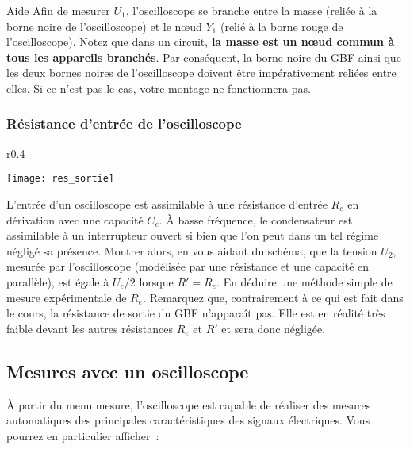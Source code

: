 \documentclass[a4paper, 11pt, final, garamond]{book}
\begin{document}
\medskip
\vspace{10pt}

\begin{instruc}{Aide}
    Afin de mesurer $U_1$, l'oscilloscope se branche entre la masse (reliée à la
    borne noire de l'oscilloscope) et le nœud $Y_1$ (relié à la borne rouge de
    l'oscilloscope). Notez que dans un circuit, \textbf{la masse est un nœud
    commun à tous les appareils branchés}.
    Par conséquent, la borne noire du GBF ainsi que les deux bornes noires de
    l'oscilloscope doivent être impérativement reliées entre elles. Si ce n'est
    pas le cas, votre montage ne fonctionnera pas.
\end{instruc}

\subsubsection{Résistance d'entrée de l'oscilloscope}

\begin{wrapfigure}[10]{r}{0.4\textwidth}
    \vspace{-20pt}
    \begin{center}
        \texttt{[image: res\_sortie]}
    \end{center}
    \vspace{-30pt}
\end{wrapfigure}

L'entrée d'un oscilloscope est assimilable à une résistance d'entrée $R_{e}$ en
dérivation avec une capacité $C_{e}$. À basse fréquence, le condensateur est
assimilable à un interrupteur ouvert si bien que l'on peut dans un tel régime
négligé sa présence. Montrer alors, en vous aidant du schéma, que la tension
$U_2$, mesurée par l'oscilloscope (modélisée par une résistance et une capacité
en parallèle), est égale à $U_{e}/2$ lorsque $R' = R_{e}$. En déduire une
méthode simple de mesure expérimentale de $R_{e}$. Remarquez que, contrairement
à ce qui est fait dans le cours, la résistance de sortie du GBF n'apparaît pas.
Elle est en réalité très faible devant les autres résistances $R_{e}$ et $R'$ et
sera donc négligée.

\subsection{Mesures avec un oscilloscope}

À partir du menu mesure, l'oscilloscope est capable de réaliser des mesures
automatiques des principales caractéristiques des signaux électriques. Vous
pourrez en particulier afficher~:
\end{document}
